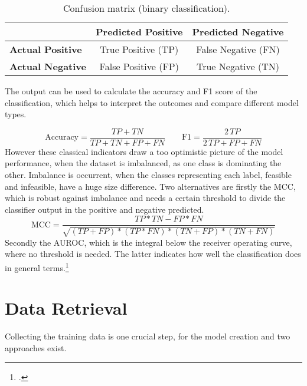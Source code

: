 \begin{table}[ht]
    \centering
    \begin{tabular}{@{}lcc@{}}
        \toprule
                                 & \textbf{Predicted Positive} & \textbf{Predicted Negative} \\
        \midrule
        \textbf{Actual Positive} & True Positive (TP)          & False Negative (FN)         \\
        \textbf{Actual Negative} & False Positive (FP)         & True Negative (TN)          \\
        \bottomrule
    \end{tabular}
    \caption{Confusion matrix (binary classification).}
    \label{tab:confusion_matrix}
\end{table}
The output can be used to calculate the accuracy and F1 score of the classification, which
helps to interpret the outcomes and compare different model types.

\[
    \text{Accuracy}=\frac{TP+TN}{TP+TN+FP+FN}
    \qquad
    \text{F1}=\frac{2\,TP}{2\,TP+FP+FN}
\]
However these classical indicators draw a too optimistic picture of the model performance, when the dataset is imbalanced, as one class is dominating the other. Imbalance is occurrent, when the classes representing each label, feasible and infeasible, have a huge size difference.
Two alternatives are firstly the \gls{MCC}, which is robust against imbalance and needs a certain threshold to divide the classifier output in the positive and negative predicted.
\[
    \text{MCC}=\frac{TP*TN - FP*FN}{\sqrt{(TP+FP)*(TP*FN)*(TN+FP)*(TN+FN)}}
\]
Secondly the \gls{AUROC}, which is the integral below the
receiver operating curve, where no threshold is needed. The latter indicates how
well the classification does in general terms.\footcite[cf.][p.2f.]{chicco_advantages_2020}


\section{Data Retrieval}
\label{sec:DataRetrieval}
Collecting the training data is one crucial step, for the model creation and two approaches exist.

